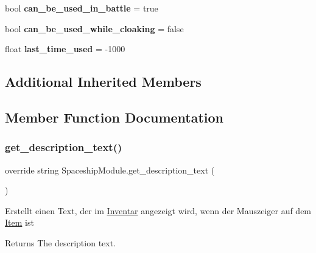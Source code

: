 \begin{DoxyCompactItemize}
\item 
\mbox{\label{class_spaceship_module_a58b067b3b1975a76a85d43399973f4e2}} 
bool {\bfseries can\+\_\+be\+\_\+used\+\_\+in\+\_\+battle} = true
\item 
\mbox{\label{class_spaceship_module_a1beada7d1235d006c9bce9d09e81869c}} 
bool {\bfseries can\+\_\+be\+\_\+used\+\_\+while\+\_\+cloaking} = false
\item 
\mbox{\label{class_spaceship_module_ac78a8369ddaf8f7bc0bd079e0a51f197}} 
float {\bfseries last\+\_\+time\+\_\+used} = -\/1000
\end{DoxyCompactItemize}
\subsection*{Additional Inherited Members}


\subsection{Member Function Documentation}
\mbox{\label{class_spaceship_module_a787019cbebc400d17dc7233ca315c6da}} 
\subsubsection{\texorpdfstring{get\+\_\+description\+\_\+text()}{get\_description\_text()}}
{\footnotesize\ttfamily override string Spaceship\+Module.\+get\+\_\+description\+\_\+text (\begin{DoxyParamCaption}{ }\end{DoxyParamCaption})\hspace{0.3cm}{\ttfamily [virtual]}}



Erstellt einen Text, der im \hyperlink{class_inventar}{Inventar} angezeigt wird, wenn der Mauszeiger auf dem \hyperlink{class_item}{Item} ist 

\begin{DoxyReturn}{Returns}
The description text.
\end{DoxyReturn}


